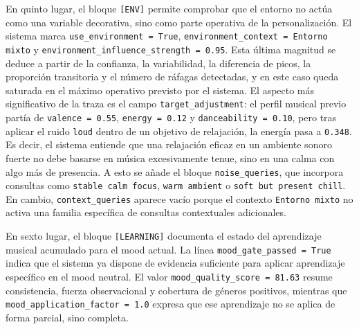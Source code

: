En quinto lugar, el bloque \texttt{[ENV]} permite comprobar que el entorno no
actúa como una variable decorativa, sino como parte operativa de la
personalización. El sistema marca \texttt{use\_environment = True},
\texttt{environment\_context = Entorno mixto} y
\texttt{environment\_influence\_strength = 0.95}. Esta última magnitud se
deduce a partir de la confianza, la variabilidad, la diferencia de picos, la
proporción transitoria y el número de ráfagas detectadas, y en este caso queda
saturada en el máximo operativo previsto por el sistema. El aspecto más
significativo de la traza es el campo \texttt{target\_adjustment}: el perfil
musical previo partía de \texttt{valence = 0.55}, \texttt{energy = 0.12} y
\texttt{danceability = 0.10}, pero tras aplicar el ruido \texttt{loud} dentro
de un objetivo de relajación, la energía pasa a \texttt{0.348}. Es decir, el
sistema entiende que una relajación eficaz en un ambiente sonoro fuerte no debe
basarse en música excesivamente tenue, sino en una calma con algo más de
presencia. A esto se añade el bloque \texttt{noise\_queries}, que incorpora
consultas como \texttt{stable calm focus}, \texttt{warm ambient} o
\texttt{soft but present chill}. En cambio, \texttt{context\_queries} aparece
vacío porque el contexto \texttt{Entorno mixto} no activa una familia
específica de consultas contextuales adicionales.

En sexto lugar, el bloque \texttt{[LEARNING]} documenta el estado del
aprendizaje musical acumulado para el mood actual. La línea
\texttt{mood\_gate\_passed = True} indica que el sistema ya dispone de
evidencia suficiente para aplicar aprendizaje específico en el mood neutral. El
valor \texttt{mood\_quality\_score = 81.63} resume consistencia, fuerza
observacional y cobertura de géneros positivos, mientras que
\texttt{mood\_application\_factor = 1.0} expresa que ese aprendizaje no se
aplica de forma parcial, sino completa.

